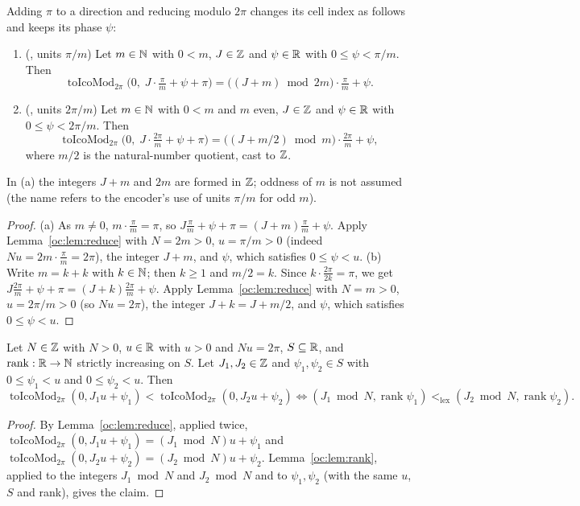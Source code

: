 \begin{lemma}\label{oc:lem:antipode-cell}
Adding $\pi$ to a direction and reducing modulo $2\pi$ changes its cell index as follows and keeps its
phase $\psi$:
\begin{enumerate}[label=(\alph*)]
\item (, units $\pi/m$) Let $m\in\mathbb N$ with $0<m$, $J\in\mathbb Z$ and $\psi\in\mathbb R$ with
  $0\le\psi<\pi/m$. Then
  \[\operatorname{toIcoMod}_{2\pi}\bigl(0,\;J\cdot\tfrac{\pi}{m}+\psi+\pi\bigr)
    =\bigl((J+m)\bmod 2m\bigr)\cdot\tfrac{\pi}{m}+\psi .\]
\item (, units $2\pi/m$) Let $m\in\mathbb N$ with $0<m$ and $m$ even, $J\in\mathbb Z$ and
  $\psi\in\mathbb R$ with $0\le\psi<2\pi/m$. Then
  \[\operatorname{toIcoMod}_{2\pi}\bigl(0,\;J\cdot\tfrac{2\pi}{m}+\psi+\pi\bigr)
    =\bigl((J+m/2)\bmod m\bigr)\cdot\tfrac{2\pi}{m}+\psi,\]
  where $m/2$ is the natural-number quotient, cast to $\mathbb Z$.
\end{enumerate}
In (a) the integers $J+m$ and $2m$ are formed in $\mathbb Z$; oddness of $m$ is not assumed (the name refers to
the encoder's use of units $\pi/m$ for odd $m$).
\end{lemma}
\begin{proof}
(a) As $m\ne0$, $m\cdot\frac{\pi}{m}=\pi$, so $J\frac{\pi}{m}+\psi+\pi=(J+m)\frac{\pi}{m}+\psi$. Apply
Lemma~\ref{oc:lem:reduce} with $N=2m>0$, $u=\pi/m>0$ (indeed $Nu=2m\cdot\frac{\pi}{m}=2\pi$), the integer
$J+m$, and $\psi$, which satisfies $0\le\psi<u$.
(b) Write $m=k+k$ with $k\in\mathbb N$; then $k\ge1$ and $m/2=k$. Since $k\cdot\frac{2\pi}{2k}=\pi$, we get
$J\frac{2\pi}{m}+\psi+\pi=(J+k)\frac{2\pi}{m}+\psi$. Apply Lemma~\ref{oc:lem:reduce} with $N=m>0$,
$u=2\pi/m>0$ (so $Nu=2\pi$), the integer $J+k=J+m/2$, and $\psi$, which satisfies $0\le\psi<u$.
\end{proof}

\begin{theorem}\label{oc:thm:key}
Let $N\in\mathbb Z$ with $N>0$, $u\in\mathbb R$ with $u>0$ and $Nu=2\pi$, $S\subseteq\mathbb R$, and $\operatorname{rank}:\mathbb R\to\mathbb N$
strictly increasing on $S$. Let $J_1,J_2\in\mathbb Z$ and $\psi_1,\psi_2\in S$ with $0\le\psi_1<u$ and
$0\le\psi_2<u$. Then
\[\operatorname{toIcoMod}_{2\pi}(0,J_1u+\psi_1)<\operatorname{toIcoMod}_{2\pi}(0,J_2u+\psi_2)
\iff(J_1\bmod N,\operatorname{rank}\psi_1)<_{\mathrm{lex}}(J_2\bmod N,\operatorname{rank}\psi_2).\]
\end{theorem}
\begin{proof}
By Lemma~\ref{oc:lem:reduce}, applied twice,
$\operatorname{toIcoMod}_{2\pi}(0,J_1u+\psi_1)=(J_1\bmod N)u+\psi_1$ and
$\operatorname{toIcoMod}_{2\pi}(0,J_2u+\psi_2)=(J_2\bmod N)u+\psi_2$. Lemma~\ref{oc:lem:rank}, applied to
the integers $J_1\bmod N$ and $J_2\bmod N$ and to $\psi_1,\psi_2$ (with the same $u$, $S$ and rank),
gives the claim.
\end{proof}


